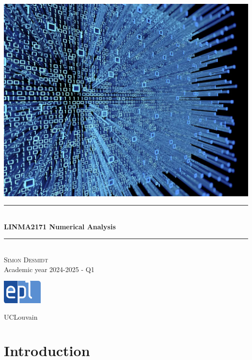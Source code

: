 \documentclass[12pt, openany]{report}
\newcommand{\HRule}{\rule{\linewidth}{0.5mm}}
\begin{document}
\begin{titlepage}
    \begin{sffamily}
    \begin{center}
        \includegraphics[scale=0.25]{img/Page de garde.png} \\[1cm]
        \HRule \\[0.4cm]
        { \huge \bfseries LINMA2171 Numerical Analysis \\[0.4cm] }
    
        \HRule \\[1.5cm]
        \textsc{\LARGE Simon Desmidt}\\[1cm]
        \vfill
        \vspace{2cm}
        {\large Academic year 2024-2025 - Q1}
        \vspace{0.4cm}
         
        \includegraphics[width=0.15\textwidth]{img/epl.png}
        
        UCLouvain\\
    
    \end{center}
    \end{sffamily}
\end{titlepage}

\setcounter{tocdepth}{1}
\tableofcontents
\chapter{Introduction}
\end{document}
